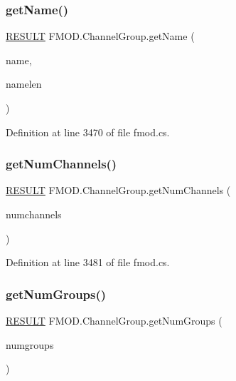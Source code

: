 \subsubsection{\texorpdfstring{get\+Name()}{getName()}}
{\footnotesize\ttfamily \hyperlink{namespace_f_m_o_d_a305d1176ef3f8c8815861a60407ac33d}{R\+E\+S\+U\+LT} F\+M\+O\+D.\+Channel\+Group.\+get\+Name (\begin{DoxyParamCaption}\item[{String\+Builder}]{name,  }\item[{int}]{namelen }\end{DoxyParamCaption})}



Definition at line 3470 of file fmod.\+cs.

\mbox{\label{class_f_m_o_d_1_1_channel_group_a28564a87ec233c5e0ed49869ed5b94c9}} 
\subsubsection{\texorpdfstring{get\+Num\+Channels()}{getNumChannels()}}
{\footnotesize\ttfamily \hyperlink{namespace_f_m_o_d_a305d1176ef3f8c8815861a60407ac33d}{R\+E\+S\+U\+LT} F\+M\+O\+D.\+Channel\+Group.\+get\+Num\+Channels (\begin{DoxyParamCaption}\item[{out int}]{numchannels }\end{DoxyParamCaption})}



Definition at line 3481 of file fmod.\+cs.

\mbox{\label{class_f_m_o_d_1_1_channel_group_ae901a3a9af8d41e2b4b2fff0e5a60287}} 
\subsubsection{\texorpdfstring{get\+Num\+Groups()}{getNumGroups()}}
{\footnotesize\ttfamily \hyperlink{namespace_f_m_o_d_a305d1176ef3f8c8815861a60407ac33d}{R\+E\+S\+U\+LT} F\+M\+O\+D.\+Channel\+Group.\+get\+Num\+Groups (\begin{DoxyParamCaption}\item[{out int}]{numgroups }\end{DoxyParamCaption})}



